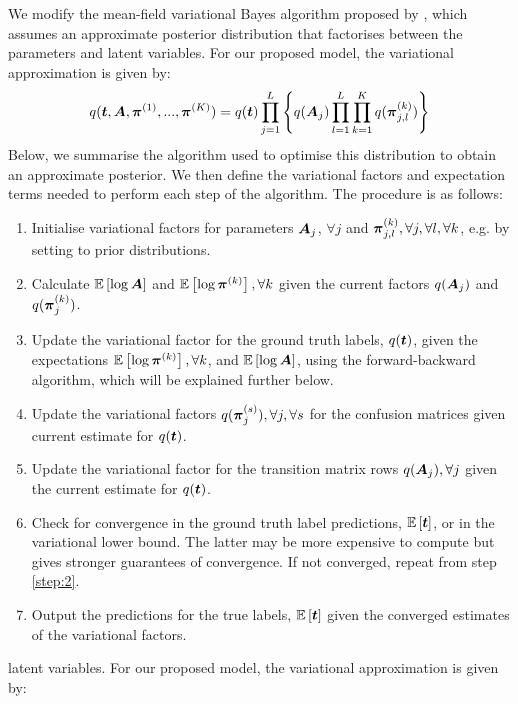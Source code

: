 We modify the mean-field variational Bayes algorithm proposed by \cite{simpsonlong}, 
which assumes an approximate posterior distribution that factorises between the parameters and 
latent variables. For our proposed model, the variational approximation is given by:
\begin{equation}
  q(\boldsymbol t, \boldsymbol A, \boldsymbol\pi^{(1)},...,\boldsymbol\pi^{(K)}) = q(\boldsymbol t)\prod_{j=1}^L \left\{ q(\boldsymbol A_j)\prod_{l=1}^L \prod_{k=1}^K  q(\boldsymbol\pi_{j,l}^{(k)}) \right\}
\end{equation}
Below, we summarise the algorithm used to optimise this distribution to obtain an approximate posterior.
We then define the variational factors and expectation terms needed to perform each step of the algorithm. The procedure is as follows:
\begin{enumerate}
 \item \label{step:1} Initialise variational factors for parameters
$\boldsymbol A_j$, $\forall j$ and
$\boldsymbol\pi_{j,l}^{(k)}, \forall j, \forall l, \forall k$, e.g. by setting to prior distributions.
 \item \label{step:2} Calculate $\mathbb{E}\left[\log \boldsymbol A \right]$ 
and $\mathbb{E}\left[\log\boldsymbol\pi^{(k)} \right], \forall k$ given the current factors 
$q(\boldsymbol A_j)$ and $q(\boldsymbol\pi_j^{(k)})$.
 \item Update the variational factor for the ground truth labels, $q(\boldsymbol t)$, given 
the expectations $\mathbb{E}\left[\log\boldsymbol\pi^{(k)} \right], \forall k$, and
$\mathbb{E}\left[\log \boldsymbol A \right]$, using the forward-backward
algorithm\cite{ghahramani2001introduction}, which will be explained further below.
 \item Update the variational factors $q(\boldsymbol\pi_j^{(s)}), \forall j, \forall s$ for the confusion matrices given current estimate for $q(\boldsymbol t)$.
 \item \label{step:4} Update the variational factor for the transition matrix rows
$q(\boldsymbol A_j), \forall j$ given the current estimate for $q(\boldsymbol t)$.
 \item \label{step:6} Check for convergence in the ground truth label predictions,
$\mathbb{E}\left[\boldsymbol t\right]$, or in the variational lower bound. 
The latter may be more expensive to compute but gives stronger guarantees of convergence. 
If not converged, repeat from step \ref{step:2}.
\item \label{step:7} Output the predictions for the true labels, $\mathbb{E}\left[\boldsymbol t\right]$ given the converged estimates of the variational factors.
\end{enumerate}
latent variables. For our proposed model, the variational approximation is given by:
